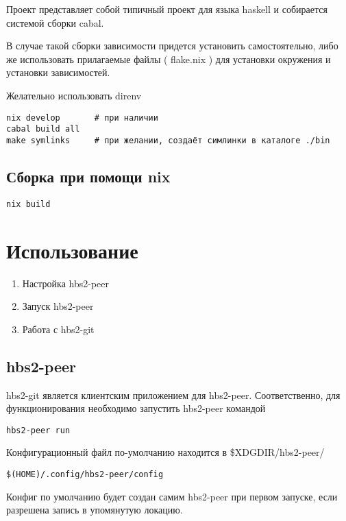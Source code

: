 \documentclass[11pt,a4paper]{article}
\begin{document}
Проект представляет собой типичный проект для языка haskell и собирается системой сборки cabal.

В случае такой сборки зависимости придется установить самостоятельно, либо же использовать
прилагаемые файлы ( flake.nix ) для установки окружения и установки зависимостей.

Желательно использовать direnv

\begin{verbatim}
nix develop       # при наличии
cabal build all
make symlinks     # при желании, создаёт симлинки в каталоге ./bin
\end{verbatim}

\subsection{Сборка при помощи nix}

\begin{verbatim}
nix build
\end{verbatim}

\section{Использование}

\begin{enumerate}
  \item Настройка hbs2-peer
  \item Запуск hbs2-peer
  \item Работа с hbs2-git
\end{enumerate}

\subsection{hbs2-peer}

hbs2-git является клиентским приложением для hbs2-peer.
Соответственно, для функционирования необходимо запустить hbs2-peer командой

\begin{verbatim}
hbs2-peer run
\end{verbatim}

Конфигурационный файл по-умолчанию находится в \$XDGDIR/hbs2-peer/

\begin{verbatim}
$(HOME)/.config/hbs2-peer/config
\end{verbatim}

Конфиг по умолчанию будет создан самим hbs2-peer при первом запуске,
если разрешена запись в упомянутую локацию.
\end{document}
